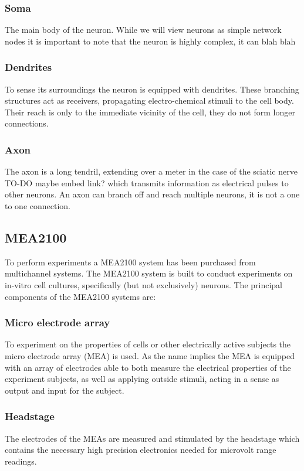 \documentclass[journal]{IEEEtran}
\begin{document}
\subsubsection{Soma}
The main body of the neuron. While we will view neurons as simple network nodes
it is important to note that the neuron is highly complex, it can blah blah
\subsubsection{Dendrites}
To sense its surroundings the neuron is equipped with dendrites. These
branching structures act as receivers, propagating electro-chemical stimuli to
the cell body. Their reach is only to the immediate vicinity of the cell, they
do not form longer connections.
\subsubsection{Axon}
The axon is a long tendril, extending over a meter in the case of the sciatic
nerve TO-DO maybe embed link? which transmits information as electrical pulses
to other neurons. An axon can branch off and reach multiple neurons, it is not a
one to one connection.
\subsection{MEA2100}
To perform experiments a MEA2100 system has been purchased from multichannel systems.
The MEA2100 system is built to conduct experiments on in-vitro cell cultures, 
specifically (but not exclusively) neurons.
The principal components of the MEA2100 systems are:
\subsubsection{Micro electrode array}
To experiment on the properties of cells or other electrically active subjects the
micro electrode array (MEA) is used. As the name implies the MEA is equipped with
an array of electrodes able to both measure the electrical properties of the 
experiment subjects, as well as applying outside stimuli, acting in a sense as
output and input for the subject.
\subsubsection{Headstage}
The electrodes of the MEAs are measured and stimulated by the headstage which
contains the necessary high precision electronics needed for microvolt range readings.
\end{document}
